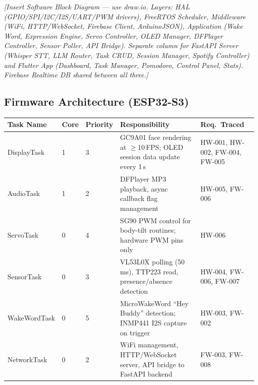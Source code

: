 \documentclass[12pt,a4paper]{article}
\begin{document}
\vspace{0.5cm}
\begin{center}
\textit{[Insert Software Block Diagram --- use draw.io. Layers:
HAL (GPIO/SPI/I2C/I2S/UART/PWM drivers), FreeRTOS Scheduler,
Middleware (WiFi, HTTP/WebSocket, Firebase Client, ArduinoJSON),
Application (Wake Word, Expression Engine, Servo Controller, OLED
Manager, DFPlayer Controller, Sensor Poller, API Bridge).
Separate column for FastAPI Server (Whisper STT, LLM Router,
Task CRUD, Session Manager, Spotify Controller) and Flutter App
(Dashboard, Task Manager, Pomodoro, Control Panel, Stats).
Firebase Realtime DB shared between all three.]}
\end{center}
\vspace{0.3cm}
\label{fig:swblock}

\vspace{0.5cm}

\subsection{Firmware Architecture (ESP32-S3)}

\begin{center}
\label{tab:rtos}
\scriptsize
\begin{tabular}{|L{0.18\textwidth}|C{0.08\textwidth}|C{0.08\textwidth}|L{0.30\textwidth}|L{0.22\textwidth}|}
\hline
\textbf{Task Name} & \textbf{Core} & \textbf{Priority} &
\textbf{Responsibility} & \textbf{Req.\ Traced} \\ \hline
DisplayTask & 1 & 3 & GC9A01 face rendering at $\geq$10\,FPS;
                       OLED session data update every 1\,s &
                       HW-001, HW-002, FW-004, FW-005 \\ \hline
AudioTask & 1 & 2 & DFPlayer MP3 playback, async callback
                     flag management & HW-005, FW-006 \\ \hline
ServoTask & 0 & 4 & SG90 PWM control for body-tilt routines;
                     hardware PWM pins only & HW-006 \\ \hline
SensorTask & 0 & 3 & VL53L0X polling (50\,ms), TTP223 read,
                      presence/absence detection &
                      HW-004, FW-006, FW-007 \\ \hline
WakeWordTask & 0 & 5 & MicroWakeWord ``Hey Buddy'' detection;
                        INMP441 I2S capture on trigger &
                        HW-003, FW-002 \\ \hline
NetworkTask & 0 & 2 & WiFi management, HTTP/WebSocket server,
                       API bridge to FastAPI backend &
                       FW-003, FW-008 \\ \hline
\end{tabular}
\end{center}
\end{document}
